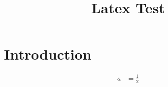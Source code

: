 \documentclass{article}
\begin{document}
\title{Latex Test}

\maketitle

\section{Introduction}

\begin{align}
    a &= \frac{1}{2}
\end{align}
\end{document}
